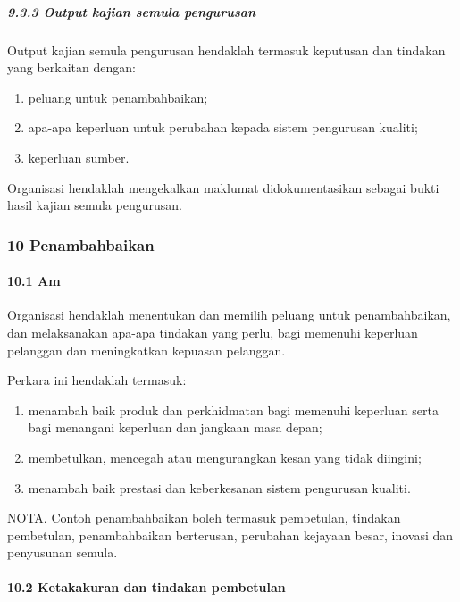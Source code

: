 \documentclass[
]{article}
\begin{document}
\hypertarget{output-kajian-semula-pengurusan}{%
\subparagraph{9.3.3 Output kajian semula
pengurusan}\label{output-kajian-semula-pengurusan}}

Output kajian semula pengurusan hendaklah termasuk keputusan dan
tindakan yang berkaitan dengan:

\begin{enumerate}
\def\labelenumi{\alph{enumi})}
\item
  peluang untuk penambahbaikan;
\item
  apa-apa keperluan untuk perubahan kepada sistem pengurusan kualiti;
\item
  keperluan sumber.
\end{enumerate}

Organisasi hendaklah mengekalkan maklumat didokumentasikan sebagai bukti
hasil kajian semula pengurusan.

\hypertarget{penambahbaikan}{%
\subsubsection{10 Penambahbaikan}\label{penambahbaikan}}

\hypertarget{am-9}{%
\paragraph{10.1 Am}\label{am-9}}

Organisasi hendaklah menentukan dan memilih peluang untuk
penambahbaikan, dan melaksanakan apa-apa tindakan yang perlu, bagi
memenuhi keperluan pelanggan dan meningkatkan kepuasan pelanggan.

Perkara ini hendaklah termasuk:

\begin{enumerate}
\def\labelenumi{\alph{enumi})}
\item
  menambah baik produk dan perkhidmatan bagi memenuhi keperluan serta
  bagi menangani keperluan dan jangkaan masa depan;
\item
  membetulkan, mencegah atau mengurangkan kesan yang tidak diingini;
\item
  menambah baik prestasi dan keberkesanan sistem pengurusan kualiti.
\end{enumerate}

NOTA. Contoh penambahbaikan boleh termasuk pembetulan, tindakan
pembetulan, penambahbaikan berterusan, perubahan kejayaan besar, inovasi
dan penyusunan semula.

\hypertarget{ketakakuran-dan-tindakan-pembetulan}{%
\paragraph{10.2 Ketakakuran dan tindakan
pembetulan}\label{ketakakuran-dan-tindakan-pembetulan}}
\end{document}
